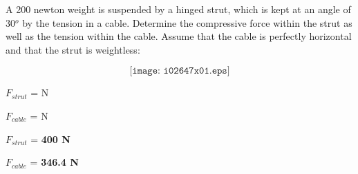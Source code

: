 

A 200 newton weight is suspended by a hinged strut, which is kept at an angle of 30$^{o}$ by the tension in a cable.  Determine the compressive force within the strut as well as the tension within the cable.  Assume that the cable is perfectly horizontal and that the strut is weightless:

$$\texttt{[image: i02647x01.eps]}$$

$F_{strut}$ = \underbar{\hskip 50pt} N

\vskip 10pt

$F_{cable}$ = \underbar{\hskip 50pt} N

\vskip 10pt







$F_{strut}$ = {\bf 400 N}

\vskip 10pt

$F_{cable}$ = {\bf 346.4 N}











